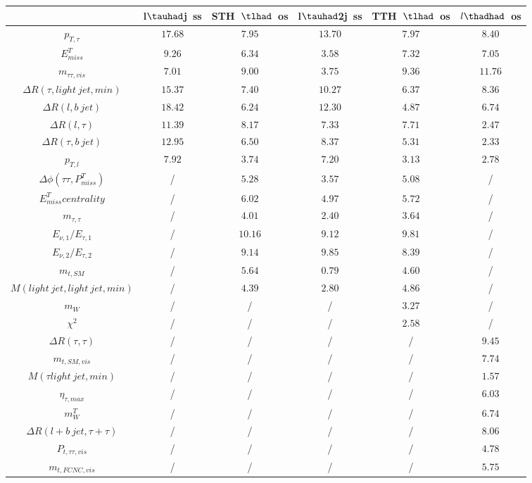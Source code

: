 \centering
\begin{tabular}{|c|c|c|c|c|c|} \hline
 & l$\tauhad$j~ss & STH~$\tlhad$~os & l$\tauhad$2j~ss & TTH~$\tlhad$~os & $l\thadhad$~os\\\hline
$p_{T,\tau }$ & $17.68$ & $7.95$ & $13.70$ & $7.97$ & $8.40$\\\hline
$E^{T}_{miss}$ & $9.26$ & $6.34$ & $3.58$ & $7.32$ & $7.05$\\\hline
$m_{\tau \tau ,vis}$ & $7.01$ & $9.00$ & $3.75$ & $9.36$ & $11.76$\\\hline
$\Delta R(\tau ,light~jet,min)$ & $15.37$ & $7.40$ & $10.27$ & $6.37$ & $8.36$\\\hline
$\Delta R(l,b~jet)$ & $18.42$ & $6.24$ & $12.30$ & $4.87$ & $6.74$\\\hline
$\Delta R(l,\tau )$ & $11.39$ & $8.17$ & $7.33$ & $7.71$ & $2.47$\\\hline
$\Delta R(\tau ,b~jet)$ & $12.95$ & $6.50$ & $8.37$ & $5.31$ & $2.33$\\\hline
$p_{T,l}$ & $7.92$ & $3.74$ & $7.20$ & $3.13$ & $2.78$\\\hline
$\Delta\phi(\tau \tau ,P^{T}_{miss})$ &  / & $5.28$ & $3.57$ & $5.08$ &  /\\\hline
$E^{T}_{miss} centrality$ &  / & $6.02$ & $4.97$ & $5.72$ &  /\\\hline
$m_{\tau ,\tau }$ &  / & $4.01$ & $2.40$ & $3.64$ &  /\\\hline
$E_{\nu,1}/E_{\tau ,1}$ &  / & $10.16$ & $9.12$ & $9.81$ &  /\\\hline
$E_{\nu,2}/E_{\tau ,2}$ &  / & $9.14$ & $9.85$ & $8.39$ &  /\\\hline
$m_{t,SM}$ &  / & $5.64$ & $0.79$ & $4.60$ &  /\\\hline
$M(light~jet,light~jet,min)$ &  / & $4.39$ & $2.80$ & $4.86$ &  /\\\hline
$m_{W}$ &  / &  / &  / & $3.27$ &  /\\\hline
$\chi^{2}$ &  / &  / &  / & $2.58$ &  /\\\hline
$\Delta R(\tau ,\tau )$ &  / &  / &  / &  / & $9.45$\\\hline
$m_{t,SM,vis}$ &  / &  / &  / &  / & $7.74$\\\hline
$M(\tau  light~jet,min)$ &  / &  / &  / &  / & $1.57$\\\hline
$\eta_{\tau ,max}$ &  / &  / &  / &  / & $6.03$\\\hline
$m^{T}_{W}$ &  / &  / &  / &  / & $6.74$\\\hline
$\Delta R(l+b~jet,\tau +\tau )$ &  / &  / &  / &  / & $8.06$\\\hline
$P_{t,\tau \tau ,vis}$ &  / &  / &  / &  / & $4.78$\\\hline
$m_{t,FCNC,vis}$ &  / &  / &  / &  / & $5.75$\\\hline
\end{tabular}
